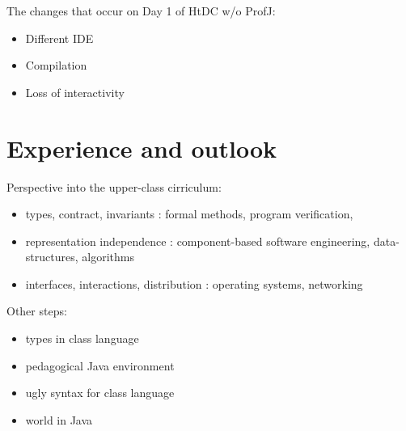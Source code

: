 \documentclass[submission,copyright]{eptcs}
\begin{document}
The changes that occur on Day 1 of HtDC w/o ProfJ:

\begin{itemize}
\item Different IDE
\item Compilation
\item Loss of interactivity
\end{itemize}

\section{Experience and outlook}

Perspective into the upper-class cirriculum:

\begin{itemize}
\item types, contract, invariants : formal methods, program verification,
  
\item representation independence : component-based software engineering,
  data-structures, algorithms

\item interfaces, interactions, distribution : operating systems, networking
\end{itemize}


Other steps:
\begin{itemize}
\item types in class language
\item pedagogical Java environment
\item ugly syntax for class language
\item world in Java
\end{itemize}

\cite{dvanhorn:sicp}

\cite{local:htdc}



\end{document}
